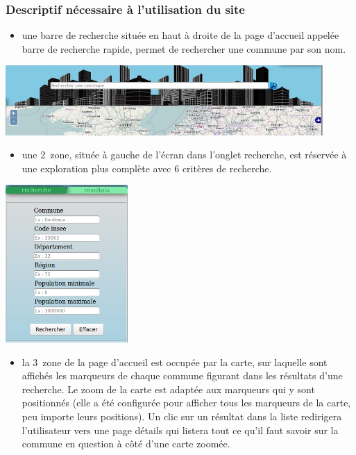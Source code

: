 \documentclass{report}
\begin{document}
\subsubsection*{Descriptif nécessaire à l'utilisation du site}
\begin{itemize}
\item une barre de recherche située en haut à droite de la page d'accueil appelée barre de recherche rapide, permet de rechercher une commune par son nom.
\\
\end{itemize}
\includegraphics[width=12.1cm]{rr.png}
\\
\begin{itemize}
\item une 2\ieme \ zone, située à gauche de l'écran dans l'onglet recherche, est réservée à une exploration plus complète avec 6 critères de recherche.
\\
\end{itemize}
\includegraphics[height=6cm]{ra.png}
\\
\begin{itemize}
\item la 3\ieme \ zone de la page d'accueil est occupée par la carte, sur laquelle sont affichés les marqueurs de chaque commune figurant dans les résultats d'une recherche. Le zoom de la carte est adaptée aux marqueurs qui y sont positionnés (elle a été configurée pour afficher tous les marqueurs de la carte, peu importe leurs positions).
Un clic sur un résultat dans la liste redirigera l'utilisateur vers une page détails qui listera tout ce qu'il faut savoir sur la commune en question à côté d'une carte zoomée.
\\
\end{itemize}
\end{document}

